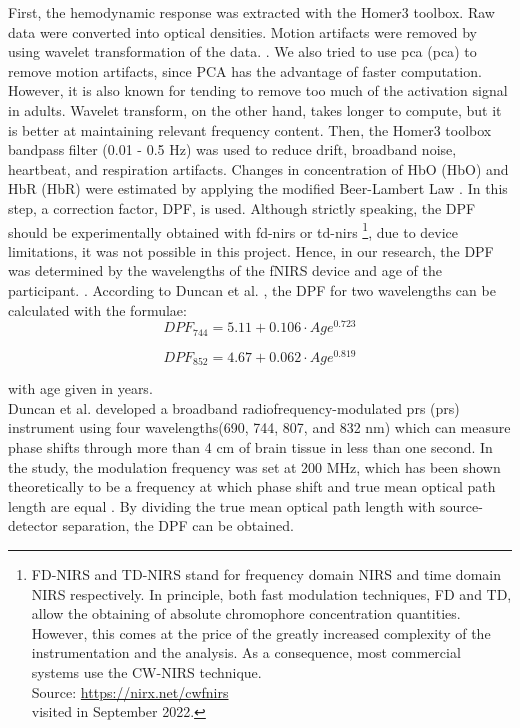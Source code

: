 First, the hemodynamic response was extracted with the Homer3 toolbox. Raw data were converted into optical densities. Motion artifacts were removed by using wavelet transformation of the data. \citep {Molavi_2012}. We also tried to use \acrlong{pca} (\acrshort{pca}) to remove motion artifacts, since PCA has the advantage of faster computation. However, it is also known for tending to remove too much of the activation signal in adults. Wavelet transform, on the other hand, takes longer to compute, but it is better at maintaining relevant frequency content. Then, the Homer3 toolbox bandpass filter (0.01 - 0.5 Hz) was used to reduce drift, broadband noise, heartbeat, and respiration artifacts. Changes in concentration of \acrlong{HbO} (\acrshort{HbO}) and  \acrlong{HbR} (\acrshort{HbR}) were estimated by applying the modified Beer-Lambert Law  \citep {Delpy_1988}. In this step, a correction factor, DPF, is used. Although strictly speaking, the DPF should be experimentally obtained with \acrshort{fd-nirs} or \acrshort{td-nirs} \footnote {FD-NIRS and TD-NIRS stand for frequency domain NIRS and time domain NIRS respectively. In principle, both fast modulation techniques, FD and TD, allow the obtaining of absolute chromophore concentration quantities. However, this comes at the price of the greatly increased complexity of the instrumentation and the analysis. As a consequence, most commercial systems use the CW-NIRS technique. \\ Source: \url{https://nirx.net/cwfnirs} \\ visited in September 2022. }, due to device limitations, it was not possible in this project. Hence, in our research, the DPF was determined by the wavelengths of the fNIRS device and age of the participant. \citep {Duncan1996MeasurementOC}. According to Duncan et al. \citeyearpar {Duncan1996MeasurementOC}, the DPF for two wavelengths can be calculated with the formulae:
\begin{equation}
DPF_{744} = 5.11 + 0.106 \cdot Age^{0.723}
\end{equation}

\begin{equation}
DPF_{852} = 4.67 + 0.062 \cdot Age^{0.819}
\end{equation}

\noindent with age given in years.\\
 
Duncan et al. \citeyearpar{Duncan1996MeasurementOC} developed a broadband radiofrequency-modulated \acrlong{prs} (\acrshort{prs}) instrument using four wavelengths(690, 744, 807, and 832 nm) which can measure phase shifts through more than 4 cm of brain tissue in less than one second. In the study, the modulation frequency was set at 200 MHz, which has been shown theoretically to be a frequency at which phase shift and true mean optical path length are equal \citep {Arridge_1992}. By dividing the true mean optical path length with source-detector  separation, the DPF can be obtained. 

